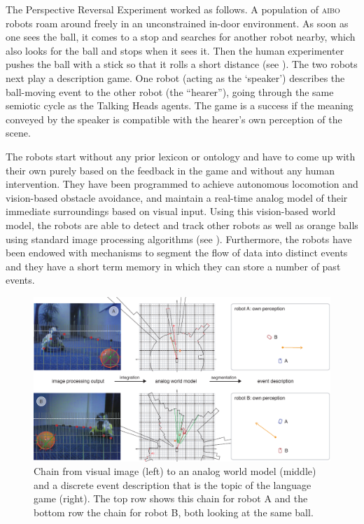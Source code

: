 The Perspective Reversal Experiment worked as follows. A population of \textsc{aibo} robots roam around
freely in an unconstrained in-door environment. As soon as one sees the
ball, it comes to a stop and searches for another robot nearby, which also
looks for the ball and stops when it sees it. Then the human
experimenter pushes the ball with a stick so that it rolls a short
distance (see ). The two robots next play a description game. One robot (acting as the `speaker') 
describes the ball-moving event to the other robot (the ``hearer''), going through the same semiotic cycle as the Talking 
Heads agents. The game is a success if the meaning conveyed by the speaker is compatible with the hearer's 
own perception of the scene. 

The robots start without any prior lexicon or ontology and have to come up with their own 
purely based on the feedback in the game and without any human intervention. 
They have been programmed to achieve autonomous locomotion and vision-based obstacle avoidance,
and maintain a real-time analog model of their immediate surroundings based on visual input. Using
this vision-based world model, the robots are able to detect and track
other robots as well as orange balls using standard image processing
algorithms (see ). Furthermore, the
robots have been endowed with mechanisms to segment the flow of data
into distinct events and they have a short term memory in which they
can store a number of past events.

\begin{figure}[htbp]
  \centerline{\includegraphics[width=.90\textwidth]{chap10/figs/persp-rev-perception.pdf}}
\caption{\label{fig:persp-rev-perception}Chain from visual image (left) to an analog world model (middle) and a discrete event description
that is the topic of the language game (right). 
The top row shows this chain for robot A and the bottom row the chain for robot B, both looking at the same ball.}
\end{figure}

